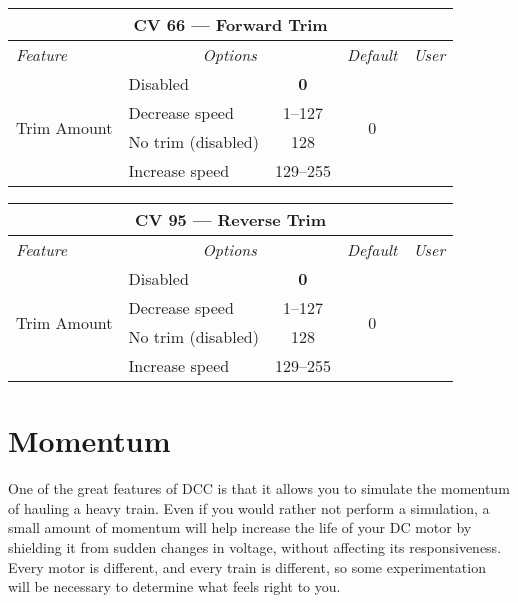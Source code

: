 \documentclass[12pt,letterpaper,draft]{memoir} %
\begin{document}
\label{CV66}
\begin{center}
\begin{tabular}{|l|lc|c|c|}
\hline
\multicolumn{5}{|c|}{\textbf{CV 66 --- Forward Trim}} \\ \hline \hline
\textit{Feature} & \multicolumn{2}{c|}{\textit{Options}} & \textit{Default} & \textit{User} \\ \hline
\multirow{4}{*}{Trim Amount}	& Disabled		& \textbf{0} 	& \multirow{4}{*}{0} 	&\\
			& Decrease speed 	& 1--127 		& 				& \\
			& No trim (disabled) 	& 128 		& 				& \\
			& Increase speed 	& 129--255 	& 				& \\ \hline
\end{tabular}
\end{center}

\label{CV95}
\begin{center}
\begin{tabular}{|l|lc|c|c|}
\hline
\multicolumn{5}{|c|}{\textbf{CV 95 --- Reverse Trim}} \\ \hline \hline
\textit{Feature} & \multicolumn{2}{c|}{\textit{Options}} & \textit{Default} & \textit{User} \\ \hline
\multirow{4}{*}{Trim Amount}	& Disabled		& \textbf{0} 	& \multirow{4}{*}{0} 	&\\
			& Decrease speed 	& 1--127 		& 				& \\
			& No trim (disabled) 	& 128 		& 				& \\
			& Increase speed 	& 129--255 	& 				& \\ \hline
\end{tabular}
\end{center}

\section{Momentum}
\label{Momentum}
One of the great features of DCC is that it allows you to simulate the momentum of hauling a heavy train. Even if you would rather not perform a simulation, a small amount of momentum will help increase the life of your DC motor by shielding it from sudden changes in voltage, without affecting its responsiveness. Every motor is different, and every train is different, so some experimentation will be necessary to determine what feels right to you. 
\end{document}
